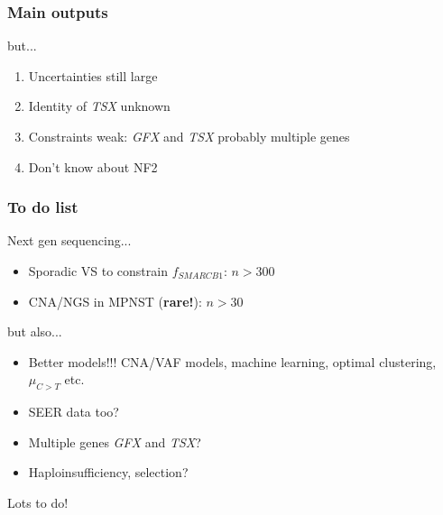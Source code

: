 \documentclass{beamer}
\begin{document}
\begin{frame}
    \frametitle{Main outputs}
    but...
    \begin{enumerate}
        \item Uncertainties still large
        \item Identity of \emph{TSX} unknown
        \item Constraints weak: \emph{GFX} and \emph{TSX} probably multiple genes
        \item Don't know about NF2
    \end{enumerate}
\end{frame}

\begin{frame}
    \frametitle{To do list}

    Next gen sequencing...
    \begin{itemize}
        \item Sporadic VS to constrain $f_{SMARCB1}$: $n > 300$
        \item CNA/NGS in MPNST (\textbf{rare!}): $n > 30$
    \end{itemize}

    but also...
    \begin{itemize}
        \item Better models!!! CNA/VAF models, machine learning, optimal clustering, $\mu_{C>T}$ etc.
        \item SEER data too?
        \item Multiple genes \emph{GFX} and \emph{TSX}? 
        \item Haploinsufficiency, selection?
    \end{itemize}

    \begin{center}
        Lots to do!
    \end{center}
\end{frame}

%
%
\end{document}
